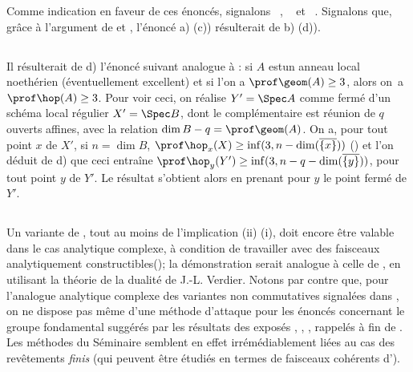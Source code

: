 Comme indication en faveur de ces \'enonc\'es, signalons ~, ~ et ~. Signalons que, gr\^ace \`a l'argument de  et , l'\'enonc\'e a) (\resp c)) r\'esulterait de b) (\resp d)).

\subsection{} \label{XIV.6.3}
Il r\'esulterait de d) l'\'enonc\'e suivant analogue \`a : si $A$ est\pageoriginale un anneau local noeth\'erien (\'eventuellement excellent) et si l'on a $\prof \geom (A) \geq 3$, alors on~a $\prof \hop (A) \geq 3$. Pour voir ceci, on r\'ealise $Y'=\Spec A$ comme ferm\'e d'un sch\'ema local r\'egulier $X'=\Spec B$, dont le compl\'ementaire est r\'eunion de $q$ ouverts affines, avec la relation $\dim B -q=\prof \geom(A)$. On a, pour tout point $x$ de $X'$, si $n=\dim B$, $\prof \hop_x(X) \geq \inf(3, n-\dim(\overline{\{x\}}))$ (\cf {}) et l'on d\'eduit de d) que ceci entra\^ine $\prof \hop_y(Y') \geq \inf(3, n-q-\dim(\overline{\{y\}}))$, pour tout point $y$ de $Y'$. Le r\'esultat s'obtient alors en prenant pour $y$ le point ferm\'e de $Y'$.

\subsection{} \label{XIV.6.4}
Un variante de , tout au moins de l'implication \textup{(ii)} \ALORS \textup{(i)}, doit encore \^etre valable dans le cas analytique complexe, \`a condition de travailler avec des faisceaux \og analytiquement constructibles\fg (\cf {}); la d\'emonstration serait analogue \`a celle de , en utilisant la th\'eorie de la dualit\'e de J.-L. Verdier. Notons par contre que, pour l'analogue analytique complexe des variantes non commutatives signal\'ees dans , on ne dispose pas m\^eme d'une m\'ethode d'attaque pour les \'enonc\'es concernant le groupe fondamental sugg\'er\'es par les r\'esultats des expos\'es , , , rappel\'es \`a fin de . Les m\'ethodes du S\'eminaire semblent en effet irr\'em\'ediablement li\'ees au cas des rev\^etements \emph{finis} (qui peuvent \^etre \'etudi\'es en termes de faisceaux coh\'erents d').

